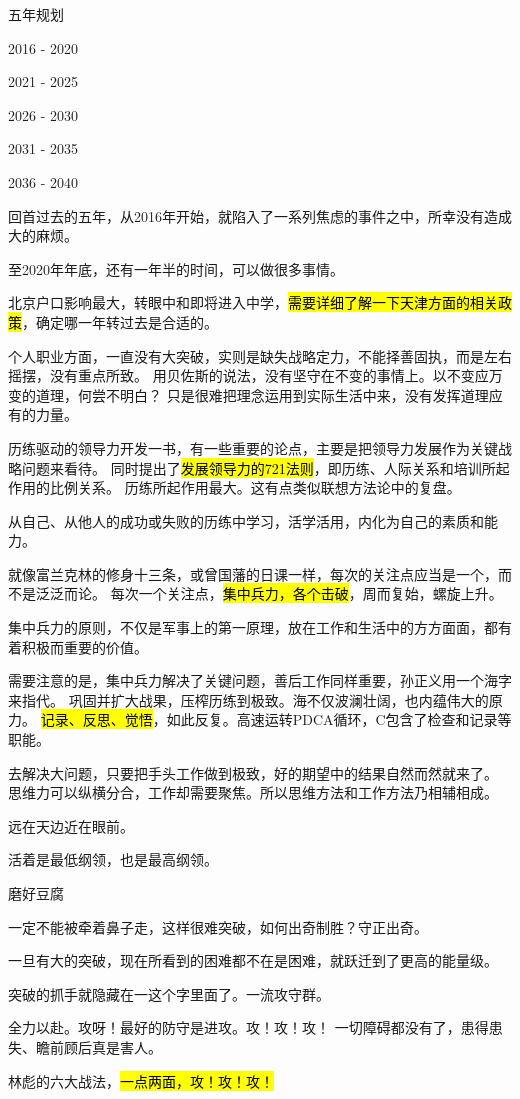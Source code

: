 五年规划
\begin{enumbox}
\item 2016 - 2020
\item 2021 - 2025
\item 2026 - 2030
\item 2031 - 2035
\item 2036 - 2040
\end{enumbox}

\hrulefill

回首过去的五年，从2016年开始，就陷入了一系列焦虑的事件之中，所幸没有造成大的麻烦。

至2020年年底，还有一年半的时间，可以做很多事情。

北京户口影响最大，转眼中和即将进入中学，\hl{需要详细了解一下天津方面的相关政策}，确定哪一年转过去是合适的。

个人职业方面，一直没有大突破，实则是缺失战略定力，不能择善固执，而是左右摇摆，没有重点所致。
用贝佐斯的说法，没有坚守在不变的事情上。以不变应万变的道理，何尝不明白？
只是很难把理念运用到实际生活中来，没有发挥道理应有的力量。

历练驱动的领导力开发一书，有一些重要的论点，主要是把领导力发展作为关键战略问题来看待。
同时提出了\hl{发展领导力的721法则}，即历练、人际关系和培训所起作用的比例关系。
历练所起作用最大。这有点类似联想方法论中的复盘。

从自己、从他人的成功或失败的历练中学习，活学活用，内化为自己的素质和能力。

就像富兰克林的修身十三条，或曾国藩的日课一样，每次的关注点应当是一个，而不是泛泛而论。
每次一个关注点，\hl{集中兵力，各个击破}，周而复始，螺旋上升。

集中兵力的原则，不仅是军事上的第一原理，放在工作和生活中的方方面面，都有着积极而重要的价值。

需要注意的是，集中兵力解决了关键问题，善后工作同样重要，孙正义用一个海字来指代。
巩固并扩大战果，压榨历练到极致。海不仅波澜壮阔，也内蕴伟大的原力。
\hl{记录、反思、觉悟}，如此反复。高速运转PDCA循环，C包含了检查和记录等职能。

去解决大问题，只要把手头工作做到极致，好的期望中的结果自然而然就来了。
思维力可以纵横分合，工作却需要聚焦。所以思维方法和工作方法乃相辅相成。

远在天边近在眼前。

活着是最低纲领，也是最高纲领。

\hrulefill

磨好豆腐

一定不能被牵着鼻子走，这样很难突破，如何出奇制胜？守正出奇。

一旦有大的突破，现在所看到的困难都不在是困难，就跃迁到了更高的能量级。

突破的抓手就隐藏在一这个字里面了。一流攻守群。

全力以赴。攻呀！最好的防守是进攻。攻！攻！攻！
一切障碍都没有了，患得患失、瞻前顾后真是害人。

林彪的六大战法，\hl{一点两面，攻！攻！攻！}
